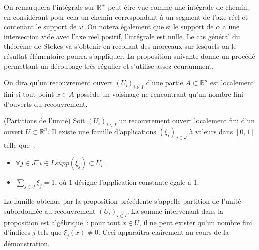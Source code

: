 On remarquera l'intégrale sur $\mathbb{R}^+$ peut être vue comme une intégrale de
chemin, en considérant pour cela un chemin correspondant à un segment de l'axe
réel et contenant le support de $\omega$.
On notera également que si le support de $\alpha$ a une intersection vide avec
l'axe réel positif, l'intégrale est nulle. Le cas général du théorème de Stokes
va s'obtenir en recollant des morceaux sur lesquels on le résultat élémentaire
pourra s'appliquer. La proposition suivante donne un procédé permettant un
découpage très régulier et s'utilise assez couramment.
\begin{fdefn}
On dira qu'un recouvrement ouvert $(U_i)_{i \in I}$ d'une partie $A \subset
\mathbb{R}^n$ est localement fini si tout point $x \in A$ possède un voisinage
ne rencontrant qu'un nombre fini d'ouverts du recouvrement.
\end{fdefn}
 \begin{fprop}{(Partitions de l'unité)}
 Soit $(U_i)_{i \in I}$ un recouvrement ouvert localement fini d'un ouvert $U
 \subset \mathbb{R}^n$. Il existe une famille d'applications $(\xi_i)_{j \in J}$ à
 valeurs dans $[0,1]$ telle que~:
 \begin{itemize}
   \item $\forall j \in J \exists i \in I \, supp(\xi_j) \subset U_i$.
   \item $\sum_{j \in J} \xi_j = 1$, où $1$ désigne l'application constante
   égale à 1.
 \end{itemize}
 \end{fprop}
La famille obtenue par la proposition précédente s'appelle partition de l'unité
subordonnée au recouvrement $(U_i)_{i \in I}$. La somme intervenant dans la
proposition est algébrique~: pour tout $x \in U$, il ne peut exister qu'un
nombre fini d'indices $j$ tels que $\xi_j(x) \neq 0$. Ceci apparaîtra clairement
au cours de la démonstration.
